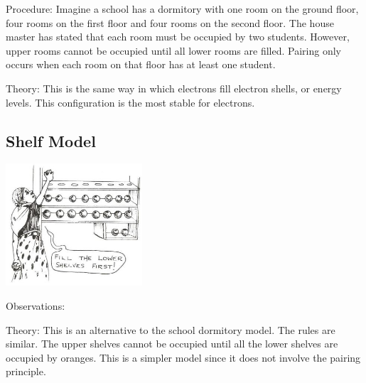 \begin{multicols}{2}
\begin{description*}
\item[Procedure:]{Imagine a school has a dormitory with one room on the
ground floor, four rooms on the first floor and
four rooms on the second floor. The house
master has stated that each room must be occupied by two students. However, upper rooms cannot be occupied until all lower rooms are filled. Pairing only occurs when each room on that floor has at least one student.}
\item[Theory:]{This is the same way in which electrons fill electron shells, or energy levels. This configuration is the most stable for electrons.}
\end{description*}

\vfill
\columnbreak

\subsection{Shelf Model}

\begin{center}
\includegraphics[width=0.38\textwidth]{./img/source/shelf-model.jpg}
\end{center}

\begin{description*}
\item[Observations:]{}
\item[Theory:]{This is an alternative to the school dormitory
model. The rules are similar. The upper shelves cannot be occupied until all
the lower shelves are occupied by oranges.
This is a simpler model since it does not
involve the pairing principle.}
\end{description*}


\end{multicols}
